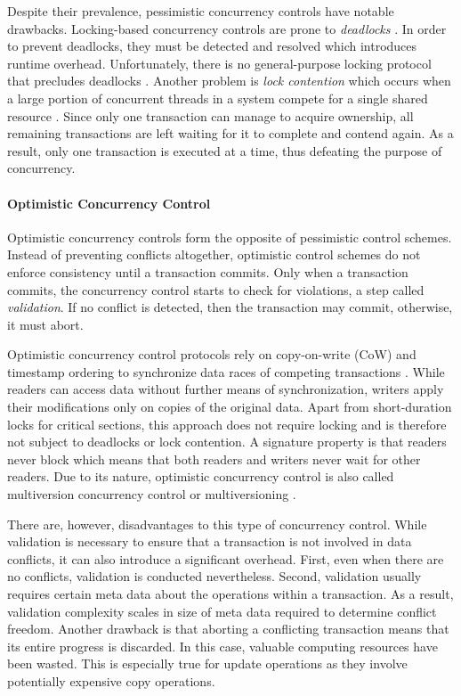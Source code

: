 Despite their prevalence, pessimistic concurrency controls have notable
drawbacks. Locking-based concurrency controls are prone to \emph{deadlocks}
\cite{bernstein1981concurrency, kung1981optimistic}. In order to prevent
deadlocks, they must be detected and resolved which introduces runtime overhead.
Unfortunately, there is no general-purpose locking protocol that precludes
deadlocks \cite{kung1981optimistic}. Another problem is \emph{lock contention}
which occurs when a large portion of concurrent threads in a system compete for
a single shared resource \cite{berenson1995critique, sadoghi2014reducing}. Since
only one transaction can manage to acquire ownership, all remaining transactions
are left waiting for it to complete and contend again. As a result, only one
transaction is executed at a time, thus defeating the purpose of concurrency.

\paragraph{Optimistic Concurrency Control}

Optimistic concurrency controls form the opposite of pessimistic control
schemes. Instead of preventing conflicts altogether, optimistic control schemes
do not enforce consistency until a transaction commits. Only when a transaction
commits, the concurrency control starts to check for violations, a step called
\emph{validation}. If no conflict is detected, then the transaction may
commit, otherwise, it must abort.

Optimistic concurrency control protocols rely on copy-on-write (CoW) and
timestamp ordering to synchronize data races of competing transactions
\cite{bernstein1981concurrency, kung1981optimistic}. While readers can access
data without further means of synchronization, writers apply their modifications
only on copies of the original data. Apart from short-duration locks for
critical sections, this approach does not require locking and is therefore not
subject to deadlocks or lock contention. A signature property is that readers
never block which means that both readers and writers never wait for other
readers. Due to its nature, optimistic concurrency control is also called
multiversion concurrency control or multiversioning
\cite{bernstein1983multiversion}.

There are, however, disadvantages to this type of concurrency control. While
validation is necessary to ensure that a transaction is not involved in data
conflicts, it can also introduce a significant overhead. First, even when there
are no conflicts, validation is conducted nevertheless. Second, validation
usually requires certain meta data about the operations within a transaction. As
a result, validation complexity scales in size of meta data required to
determine conflict freedom. Another drawback is that aborting a conflicting
transaction means that its entire progress is discarded. In this case, valuable
computing resources have been wasted. This is especially true for update
operations as they involve potentially expensive copy operations.

